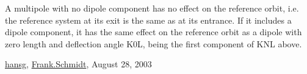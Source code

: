  A multipole with no dipole component has no effect on the reference orbit, i.e. the reference system at its exit is the same as at its entrance. If it includes a dipole component, it has the same effect on the reference orbit as a dipole with zero length and deflection angle K0L, being the first component of KNL above. 

\href{http://www.cern.ch/Hans.Grote/hansg_sign.html}{hansg}, \href{http://www.cern.ch/Frank.Schmidt/frs_sign.html}{Frank.Schmidt}, August 28, 2003  

